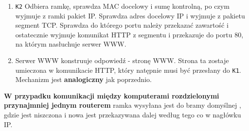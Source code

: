 \documentclass[../sk-egzamin.tex]{subfiles}
\begin{document}
\begin{enumerate}
    \item \texttt{K2} Odbiera ramkę, sprawdza MAC docelowy i sumę kontrolną,
    po czym wyjmuje z ramki pakiet IP.
    Sprawdza adres docelowy IP i wyjmuje z pakietu segment TCP.
    Sprawdza do którego portu należy przekazać zawartość 
    i ostatecznie wyjmuje komunikat HTTP z segmentu i przekazuje do portu 80,
    na którym nasłuchuje serwer WWW.

    \item Serwer WWW konstruuje odpowiedź - stronę WWW.
    Strona ta zostaje umieczona w komunikacie HTTP, który natępnie musi być
    przesłany do \texttt{K1}. Mechanizm jest \textbf{analogiczny} jak
    poprzednio.
\end{enumerate}

\textbf{W przypadku komunikacji między komputerami rozdzielonymi przynajmniej
jednym routerem} ramka wysyłana jest do bramy domyślnej ,
gdzie jest niszczona i nowa jest przekazywana dalej według tego co w nagłówku
IP.

\pagebreak
\end{document}
